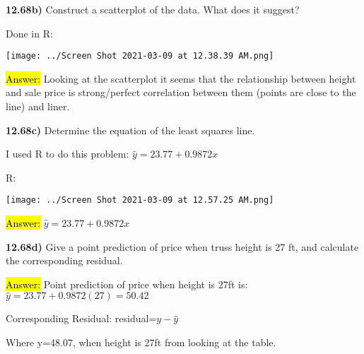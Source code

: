 \documentclass{article}
\begin{document}
\vspace{5mm}

\textbf{12.68b)} Construct a scatterplot of the data. What does it suggest?

Done in R:

\vspace{2mm}

\texttt{[image: ../Screen Shot 2021-03-09 at 12.38.39 AM.png]}

\vspace{2mm}

\hl{Answer:} Looking at the scatterplot it seems that the relationship between height and sale price is strong/perfect correlation between them (points are close to the line) and liner. 



\vspace{5mm}

\textbf{12.68c)} Determine the equation of the least squares line.

\vspace{2mm}


I used R to do this problem: $\hat{y}=23.77+0.9872x$

\vspace{2mm}

\newpage

R:

\vspace{2mm}

\texttt{[image: ../Screen Shot 2021-03-09 at 12.57.25 AM.png]}


\hl{Answer:}  $\hat{y}=23.77+0.9872x$


\vspace{5mm}

\textbf{12.68d)} Give a point prediction of price when truss height is 27 ft, and calculate the corresponding residual.

\vspace{2mm}

\hl{Answer:}  Point prediction of price when height is 27ft is: $\hat{y}=23.77+0.9872(27)=50.42$

\vspace{2mm}

Corresponding Residual: residual=$y-\hat{y}$

\vspace{2mm}

Where y=48.07, when height is 27ft from looking at the table.
\end{document}
